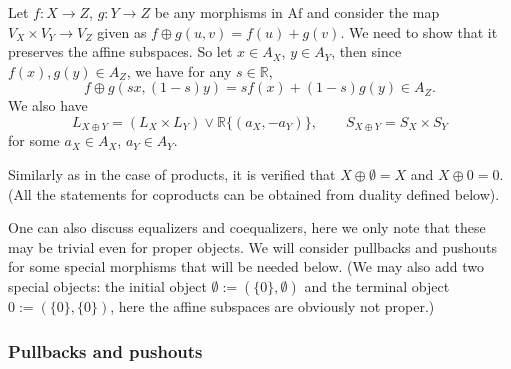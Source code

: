 \documentclass[12pt]{article}
\theoremstyle{definition}
\theoremstyle{remark}
\def\Fe{\mathcal F}
\def \Af{\mathrm{Af}}
\def\bX{ X}
\def\bY{ Y}
\def\bZ{Z}
\begin{document}
Let  $f:\bX\to \bZ$, $g:\bY\to \bZ$ be any morphisms in $\Af$ and consider the map
$V_\bX\times V_\bY\to V_\bZ$ given as
$f\oplus g(u,v)=f(u)+g(v)$. We need to show that it preserves the affine subspaces. So let 
$x\in A_\bX$, $y\in  A_\bY$, then since $f(x),g(y)\in A_\bZ$, we have for any $s\in \mathbb R$,
\[
f\oplus g(sx,(1-s)y)=sf(x)+(1-s)g(y)\in A_\bZ.
\]
We also have
\[
L_{X\oplus Y}= (L_X\times L_Y)\vee \mathbb R\{(a_X,-a_Y)\},\qquad S_{X\oplus Y}=S_X\times
S_Y
\]
for some $a_X\in A_X$, $a_Y\in A_Y$.

Similarly as in the case of products, it is verified that $X\oplus \emptyset=X$ and
$X\oplus 0=0$. (All the statements for coproducts can be obtained from duality defined
below).

\medskip

One can also discuss equalizers and coequalizers, here we only note that these may be
trivial even for proper objects. We will  consider pullbacks and pushouts for some special
morphisms that will be needed below.
(We may
also add
two special objects: the initial object $\emptyset:=(\{0\}, \emptyset)$ and the terminal
object $0:=(\{0\},\{0\})$, here the affine subspaces are obviously not proper.)

\subsubsection{Pullbacks and pushouts}

%
%
%
%
%
%
%
%
%
\end{document}
